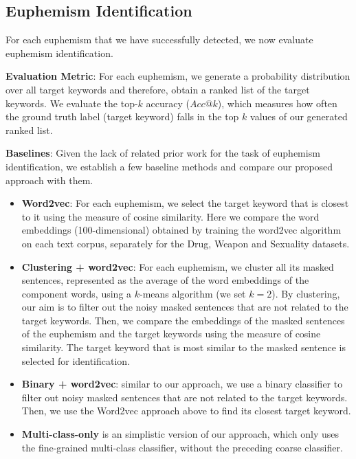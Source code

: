 \subsection{Euphemism Identification}
\label{sec:res_iden}
For each euphemism that we have successfully detected, we now evaluate euphemism identification. 

\noindent \textbf{Evaluation Metric}: 
For each euphemism, we generate a probability distribution over all target keywords and therefore, obtain a ranked list of the target keywords. 
We evaluate the top-$k$ accuracy ($Acc@k$), which measures how often the ground truth label (target keyword) falls in the top $k$ values of our generated ranked list. 


\noindent \textbf{Baselines}: 
Given the lack of related prior work for the task of euphemism identification, we establish a few  baseline methods and compare our proposed approach with them.

\begin{itemize}%
	\item \textbf{Word2vec}: %
	For each euphemism, we select the target keyword that is closest to it using the measure of cosine similarity. Here we compare the word embeddings (100-dimensional) obtained by training the word2vec algorithm \cite{mikolov2013distributed,mikolov2013efficient}  on each text corpus, separately for the Drug, Weapon and Sexuality datasets. %
	\item \textbf{Clustering + word2vec}: For each euphemism, we cluster all its masked sentences, represented as the average of the word embeddings of the component words, using  a $k$-means  algorithm (we set $k=2$). By clustering, our aim is to filter out the noisy masked sentences that are not related to the target keywords. Then, we compare  the embeddings of the masked sentences of the euphemism and the target keywords using the measure of cosine similarity. The target keyword that is most similar to the masked sentence is selected for identification. 
	\item \textbf{Binary + word2vec}: similar to our approach, we use a binary classifier to filter out noisy masked sentences that are not related to the target keywords. Then, we use the Word2vec approach above to find its closest target keyword. 
	\item \textbf{Multi-class-only} is an simplistic version of our approach, which only uses the fine-grained multi-class classifier, without the preceding coarse classifier. 
\end{itemize}


